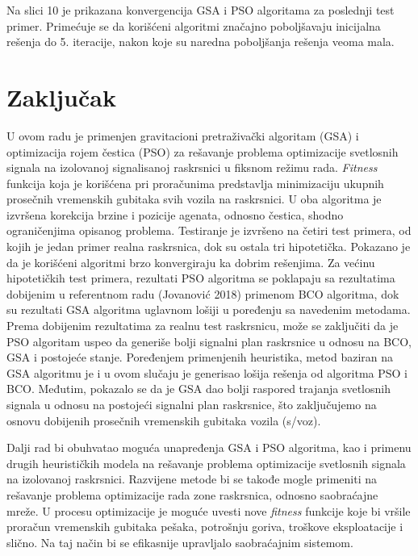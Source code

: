 
Na slici 10 je prikazana konvergencija GSA i PSO algoritama za poslednji test primer. Primećuje se da korišćeni algoritmi značajno poboljšavaju inicijalna rešenja do 5. iteracije, nakon koje su naredna poboljšanja rešenja veoma mala.


\section{Zaključak}

U ovom radu je primenjen gravitacioni pretraživački algoritam (GSA) i optimizacija rojem čestica (PSO) za rešavanje problema optimizacije svetlosnih signala na izolovanoj signalisanoj raskrsnici u fiksnom režimu rada. \emph{Fitness} funkcija koja je korišćena pri proračunima predstavlja minimizaciju ukupnih prosečnih vremenskih gubitaka svih vozila na raskrsnici. U oba algoritma je izvršena korekcija brzine i pozicije agenata, odnosno čestica, shodno ograničenjima opisanog problema. Testiranje je izvršeno na četiri test primera, od kojih je jedan primer realna raskrsnica, dok su ostala tri hipotetička. Pokazano je da je korišćeni algoritmi brzo konvergiraju ka dobrim rešenjima. Za većinu hipotetičkih test primera, rezultati PSO algoritma se poklapaju sa rezultatima dobijenim u referentnom radu (Jovanović 2018) primenom BCO algoritma, dok su rezultati GSA algoritma uglavnom lošiji u poređenju sa navedenim metodama. Prema dobijenim rezultatima za realnu test raskrsnicu, može se zaključiti da je PSO algoritam uspeo da generiše bolji signalni plan raskrsnice u odnosu na BCO, GSA i postojeće stanje. Poređenjem primenjenih heuristika, metod baziran na GSA algoritmu je i u ovom slučaju je generisao lošija rešenja od algoritma PSO i BCO. Međutim, pokazalo se da je GSA dao bolji raspored trajanja svetlosnih signala u odnosu na postojeći signalni plan raskrsnice, što zaključujemo na osnovu dobijenih prosečnih vremenskih gubitaka vozila (s/voz).

Dalji rad bi obuhvatao moguća unapređenja GSA i PSO algoritma, kao i primenu drugih heurističkih modela na rešavanje problema optimizacije svetlosnih signala na izolovanoj raskrsnici. Razvijene metode bi se takođe mogle primeniti na rešavanje problema optimizacije rada zone raskrsnica, odnosno saobraćajne mreže. U procesu optimizacije je moguće uvesti nove \emph{fitness} funkcije koje bi vršile proračun vremenskih gubitaka pešaka, potrošnju goriva, troškove eksploatacije i slično. Na taj način bi se efikasnije upravljalo saobraćajnim sistemom. 

